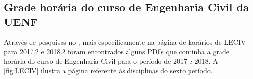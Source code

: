 \subsection{Grade horária do curso de Engenharia Civil da UENF} \label{ssec:leciv}                        %

Através de pesquisas no , mais especificamente na página de horários do LECIV para 2017.2 e 2018.2 foram encontrados alguns PDFs que continha a grade horária do curso de Engenharia Civil para o período de 2017 e 2018. A \autoref{fig:LECIV} ilustra a página referente às disciplinas do sexto período.

